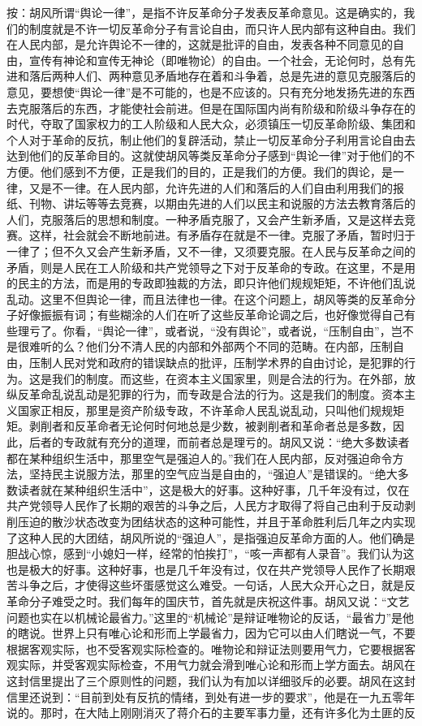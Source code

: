 按：胡风所谓“舆论一律”，是指不许反革命分子发表反革命意见。这是确实的，我们的制度就是不许一切反革命分子有言论自由，而只许人民内部有这种自由。我们在人民内部，是允许舆论不一律的，这就是批评的自由，发表各种不同意见的自由，宣传有神论和宣传无神论（即唯物论）的自由。一个社会，无论何时，总有先进和落后两种人们、两种意见矛盾地存在着和斗争着，总是先进的意见克服落后的意见，要想使“舆论一律”是不可能的，也是不应该的。只有充分地发扬先进的东西去克服落后的东西，才能使社会前进。但是在国际国内尚有阶级和阶级斗争存在的时代，夺取了国家权力的工人阶级和人民大众，必须镇压一切反革命阶级、集团和个人对于革命的反抗，制止他们的复辟活动，禁止一切反革命分子利用言论自由去达到他们的反革命目的。这就使胡风等类反革命分子感到“舆论一律”对于他们的不方便。他们感到不方便，正是我们的目的，正是我们的方便。我们的舆论，是一律，又是不一律。在人民内部，允许先进的人们和落后的人们自由利用我们的报纸、刊物、讲坛等等去竞赛，以期由先进的人们以民主和说服的方法去教育落后的人们，克服落后的思想和制度。一种矛盾克服了，又会产生新矛盾，又是这样去竞赛。这样，社会就会不断地前进。有矛盾存在就是不一律。克服了矛盾，暂时归于一律了；但不久又会产生新矛盾，又不一律，又须要克服。在人民与反革命之间的矛盾，则是人民在工人阶级和共产党领导之下对于反革命的专政。在这里，不是用的民主的方法，而是用的专政即独裁的方法，即只许他们规规矩矩，不许他们乱说乱动。这里不但舆论一律，而且法律也一律。在这个问题上，胡风等类的反革命分子好像振振有词；有些糊涂的人们在听了这些反革命论调之后，也好像觉得自己有些理亏了。你看，“舆论一律”，或者说，“没有舆论”，或者说，“压制自由”，岂不是很难听的么？他们分不清人民的内部和外部两个不同的范畴。在内部，压制自由，压制人民对党和政府的错误缺点的批评，压制学术界的自由讨论，是犯罪的行为。这是我们的制度。而这些，在资本主义国家里，则是合法的行为。在外部，放纵反革命乱说乱动是犯罪的行为，而专政是合法的行为。这是我们的制度。资本主义国家正相反，那里是资产阶级专政，不许革命人民乱说乱动，只叫他们规规矩矩。剥削者和反革命者无论何时何地总是少数，被剥削者和革命者总是多数，因此，后者的专政就有充分的道理，而前者总是理亏的。胡风又说：“绝大多数读者都在某种组织生活中，那里空气是强迫人的。”我们在人民内部，反对强迫命令方法，坚持民主说服方法，那里的空气应当是自由的，“强迫人”是错误的。“绝大多数读者就在某种组织生活中”，这是极大的好事。这种好事，几千年没有过，仅在共产党领导人民作了长期的艰苦的斗争之后，人民方才取得了将自己由利于反动剥削压迫的散沙状态改变为团结状态的这种可能性，并且于革命胜利后几年之内实现了这种人民的大团结，胡风所说的“强迫人”，是指强迫反革命方面的人。他们确是胆战心惊，感到“小媳妇一样，经常的怕挨打”，“咳一声都有人录音”。我们认为这也是极大的好事。这种好事，也是几千年没有过，仅在共产党领导人民作了长期艰苦斗争之后，才使得这些坏蛋感觉这么难受。一句话，人民大众开心之日，就是反革命分子难受之时。我们每年的国庆节，首先就是庆祝这件事。胡风又说：“文艺问题也实在以机械论最省力。”这里的“机械论”是辩证唯物论的反话，“最省力”是他的瞎说。世界上只有唯心论和形而上学最省力，因为它可以由人们瞎说一气，不要根据客观实际，也不受客观实际检查的。唯物论和辩证法则要用气力，它要根据客观实际，并受客观实际检查，不用气力就会滑到唯心论和形而上学方面去。胡风在这封信里提出了三个原则性的问题，我们认为有加以详细驳斥的必要。胡风在这封信里还说到：“目前到处有反抗的情绪，到处有进一步的要求”，他是在一九五零年说的。那时，在大陆上刚刚消灭了蒋介石的主要军事力量，还有许多化为土匪的反